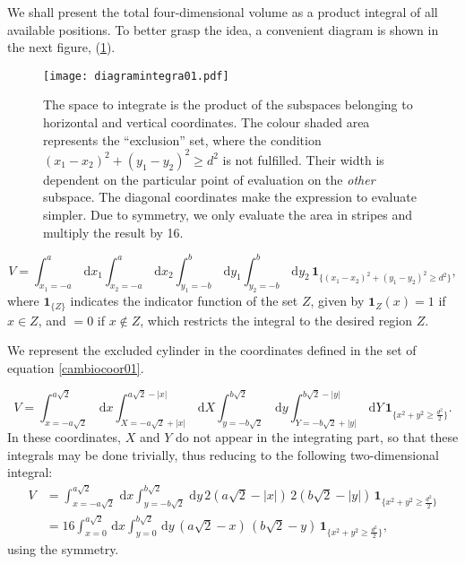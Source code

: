 \documentclass[a4paper,10pt]{article}
\newcommand{\rd}{\, \mathrm{d}}
\newcommand{\indicator}[1]{\mathbf{1}_{ \{   #1 \} } }
\begin{document}
We shall present the total four-dimensional volume as a product integral
of all available positions. To better grasp the idea, a convenient
diagram is shown in the next figure, (\ref{diagintegra01}).

\begin{figure}[h]
  \centering
  \texttt{[image: diagramintegra01.pdf]}
  \caption{The space to integrate is the product of the subspaces
    belonging to horizontal and vertical coordinates. The colour
    shaded area represents the ``exclusion'' set, where the condition 
    $ (x_1-x_2)^2 + (y_1-y_2)^2 \ge d^2 $ is not fulfilled. 
    Their width is dependent on the particular point of evaluation
    on the \emph{other} subspace. The diagonal coordinates
    make the expression to evaluate simpler. Due to 
    symmetry, we only evaluate the area in stripes and
    multiply the result by 16.}\label{diagintegra01}
\end{figure}

\begin{equation}\label{volindic}
 V = \int_{x_1 = -a}^a \rd x_1 \int_{x_2 = -a}^a \rd x_2 
\int_{y_1 = -b}^b \rd y_1 \int_{y_2 = -b}^b \rd y_2 \, \indicator{ (x_1-x_2)^2 + (y_1-y_2)^2 \ge d^2 },
\end{equation}
where $\indicator{Z}$ indicates the indicator function of the set $Z$, given by $\mathbf{1}_Z (x) = 1$ if $x \in Z$, and $=0$ if $x \notin Z$, which restricts the integral to the desired region $Z$.

We represent the excluded cylinder in the coordinates defined in 
the set of equation \ref{cambiocoor01}. 

\begin{equation}\label{integraltotal}
 V = \int_{x=-a \sqrt{2}}^{a \sqrt{2}} \rd x 
\int_{X=-a \sqrt{2} + |x| }^{a \sqrt{2} - |x|}  \rd X
 \int_{y=-b \sqrt{2}}^{b \sqrt{2}} \rd y
\int_{Y=-b \sqrt{2} + |y| }^{b \sqrt{2}-|y|}  \rd Y
\, \indicator{ x^2 + y^2 \ge \frac{d^2}{2}  }.
\end{equation}
In these coordinates, $X$ and $Y$ do not appear in the integrating part, so that these integrals may be done trivially, thus reducing to the following two-dimensional integral:
\begin{align}
 V &= \int_{x=-a \sqrt{2}}^{a \sqrt{2}} \rd x  \int_{y=-b \sqrt{2}}^{b \sqrt{2}} \rd y
\, 2 \left( a \sqrt{2} - |x| \right) \, 2 \left( b \sqrt{2} - |y| \right) \,  \indicator{ x^2 + y^2 \ge \frac{d^2}{2} } \\
&= 16 \int_{x=0}^{a \sqrt{2}} \rd x  \int_{y=0}^{b \sqrt{2}} \rd y
\, \left( a \sqrt{2} - x \right) \, \left( b \sqrt{2} - y \right) \,  \indicator{ x^2 + y^2 \ge \frac{d^2}{2} },
\end{align}
using the symmetry.
\end{document}
